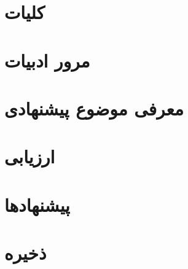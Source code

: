 




\section{کلیات}





\section{مرور ادبیات}

\section{معرفی موضوع پیشنهادی}

\section{ارزیابی}

\section{پیشنهادها}


\section{ذخیره}



